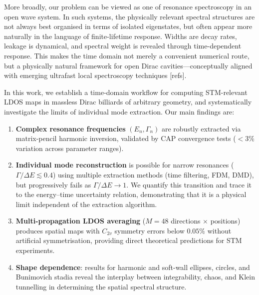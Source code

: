 \documentclass[11pt,a4paper]{article}
\begin{document}

More broadly, our problem can be viewed as one of resonance
spectroscopy in an open wave system.  In such systems, the
physically relevant spectral structures are not always best
organised in terms of isolated eigenstates, but often appear more
naturally in the language of finite-lifetime response.  Widths are
decay rates, leakage is dynamical, and spectral weight is revealed
through time-dependent response.  This makes the time domain not
merely a convenient numerical route, but a physically natural
framework for open Dirac cavities---conceptually aligned with
emerging ultrafast local spectroscopy techniques [refs].


In this work, we establish a time-domain workflow for computing
STM-relevant LDOS maps in massless Dirac billiards of arbitrary
geometry, and systematically investigate the limits of individual
mode extraction.  Our main findings are:

\begin{enumerate}
  \item \textbf{Complex resonance frequencies} $(E_n, \Gamma_n)$
        are robustly extracted via matrix-pencil harmonic inversion,
        validated by CAP convergence tests ($<3\%$ variation across
        parameter ranges).

  \item \textbf{Individual mode reconstruction} is possible for
        narrow resonances ($\Gamma/\Delta E \lesssim 0.4$) using
        multiple extraction methods (time filtering, FDM, DMD), but
        progressively fails as $\Gamma/\Delta E \to 1$.
        We quantify this transition and trace it to the energy--time
        uncertainty relation, demonstrating that it is a physical limit
        independent of the extraction algorithm.

  \item \textbf{Multi-propagation LDOS averaging} ($M = 48$
        directions $\times$ positions) produces spatial maps with
        $C_{2v}$ symmetry errors below $0.05\%$ without artificial
        symmetrisation, providing direct theoretical predictions for
        STM experiments.

  \item \textbf{Shape dependence}: results for harmonic and soft-wall
        ellipses, circles, and Bunimovich stadia reveal the interplay
        between integrability, chaos, and Klein tunnelling in
        determining the spatial spectral structure.
\end{enumerate}
\end{document}
